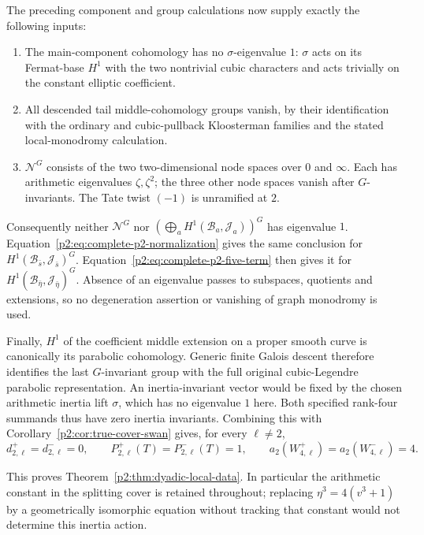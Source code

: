 The preceding component and group calculations now supply exactly the
following inputs:
\begin{enumerate}
\item The main-component cohomology has no $\sigma$-eigenvalue $1$:
$\sigma$ acts on its Fermat-base $H^1$ with the two nontrivial cubic
characters and acts trivially on the constant elliptic coefficient.
\item All descended tail middle-cohomology groups vanish, by their
identification with the ordinary and cubic-pullback Kloosterman
families and the stated local-monodromy calculation.
\item $\mathcal N^G$ consists of the two two-dimensional node spaces
over $0$ and $\infty$. Each has arithmetic eigenvalues
$\zeta,\zeta^2$; the three other node spaces vanish after $G$-invariants.
The Tate twist $(-1)$ is unramified at $2$.
\end{enumerate}
Consequently neither $\mathcal N^G$ nor
$(\bigoplus_a H^1(\mathcal B_a,\mathcal J_a))^G$ has eigenvalue $1$.
Equation~\eqref{p2:eq:complete-p2-normalization} gives the same conclusion
for $H^1(\mathcal B_{\bar s},\mathcal J_{\bar s})^G$.
Equation~\eqref{p2:eq:complete-p2-five-term} then gives it for
$H^1(\mathcal B_{\bar\eta},\mathcal J_{\bar\eta})^G$.
Absence of an eigenvalue passes to subspaces, quotients and extensions,
so no degeneration assertion or vanishing of graph monodromy is used.

Finally, $H^1$ of the coefficient middle extension on a proper smooth
curve is canonically its parabolic cohomology. Generic finite Galois
descent therefore identifies the last $G$-invariant group with the full
original cubic-Legendre parabolic representation. An inertia-invariant
vector would be fixed by the chosen arithmetic inertia lift $\sigma$,
which has no eigenvalue $1$ here. Both specified rank-four summands
thus have zero inertia invariants. Combining this with Corollary~\ref{p2:cor:true-cover-swan} gives, for every $\ell\ne2$,
\[
 d_{2,\ell}^+=d_{2,\ell}^-=0,\qquad
 P^+_{2,\ell}(T)=P^-_{2,\ell}(T)=1,\qquad
 a_2(W^+_{4,\ell})=a_2(W^-_{4,\ell})=4.
\]


This proves Theorem~\ref{p2:thm:dyadic-local-data}. In particular the
arithmetic constant in the splitting cover is retained throughout;
replacing $\eta^3=4(v^3+1)$ by a geometrically isomorphic equation
without tracking that constant would not determine this inertia action.

